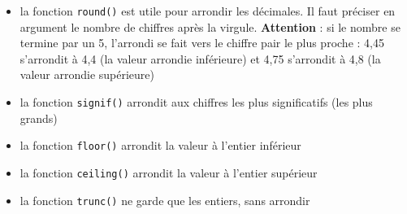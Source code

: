 \documentclass[
]{book}
\providecommand{\tightlist}{%
  \setlength{\itemsep}{0pt}\setlength{\parskip}{0pt}}
\begin{document}
\begin{itemize}
\tightlist
\item
  la fonction \texttt{round()} est utile pour arrondir les décimales. Il faut préciser en argument le nombre de chiffres après la virgule. \textbf{Attention} : si le nombre se termine par un 5, l'arrondi se fait vers le chiffre pair le plus proche : 4,45 s'arrondit à 4,4 (la valeur arrondie inférieure) et 4,75 s'arrondit à 4,8 (la valeur arrondie supérieure)
\item
  la fonction \texttt{signif()} arrondit aux chiffres les plus significatifs (les plus grands)
\item
  la fonction \texttt{floor()} arrondit la valeur à l'entier inférieur
\item
  la fonction \texttt{ceiling()} arrondit la valeur à l'entier supérieur
\item
  la fonction \texttt{trunc()} ne garde que les entiers, sans arrondir
\end{itemize}
\end{document}
